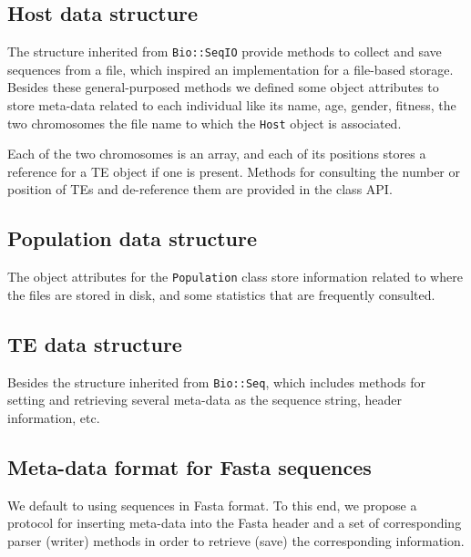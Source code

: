 \documentclass[10pt]{article}
\begin{document}
\subsection{Host data structure}
The structure inherited from \verb|Bio::SeqIO| provide methods to
collect and save sequences from a file, which inspired an
implementation for a file-based storage. Besides these
general-purposed methods we defined some object attributes to store
meta-data related to each individual like its name, age, gender,
fitness, the two chromosomes the file name to which the \verb|Host|
object is associated.

Each of the two chromosomes is an array, and each of its positions
stores a reference for a TE object if one is present. Methods for
consulting the number or position of TEs and de-reference them are
provided in the class API.

\subsection{Population data structure}
The object attributes for the \verb|Population| class store
information related to where the files are stored in disk, and some
statistics that are frequently consulted.


\subsection{TE data structure}

Besides the structure inherited from \verb|Bio::Seq|, which includes
methods for setting and retrieving several meta-data as the sequence
string, header information, etc.



\subsection{Meta-data format for Fasta sequences}

We default to using sequences in Fasta format. To this end, we propose
a protocol for inserting meta-data into the Fasta header and a set of
corresponding parser (writer) methods in order to retrieve (save) the
corresponding information.

\end{document}
